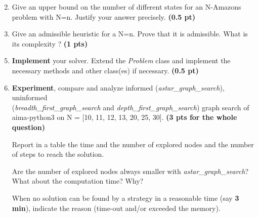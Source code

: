 \documentclass[11pt,a4paper]{report}
\begin{document}
\begin{answers}[8cm]
\end{answers}


\newpage
\begin{enumerate}
\setcounter{enumi}{1}
\item Give an upper bound on the number of different states for an N-Amazons problem with N=n. Justify your answer precisely. \textbf{(0.5 pt)}
\end{enumerate}

\begin{answers}[5cm]
\end{answers}



\begin{enumerate}
\setcounter{enumi}{2}
\item Give an admissible heuristic for a N=n. Prove that it is admissible. What is its complexity ? \textbf{(1 pts)}
\end{enumerate}

\begin{answers}[5cm]
\end{answers}



\begin{enumerate}
\setcounter{enumi}{4}
\item \textbf{Implement} your solver. Extend the \emph{Problem} class and implement 
		the necessary methods and other class(es) if necessary.  \textbf{(0.5 pt)}
\item \textbf{Experiment}, compare and analyze informed (\emph{astar\_graph\_search}), uninformed \\
    (\emph{breadth\_first\_graph\_search} and \emph{depth\_first\_graph\_search}) graph search of aima-python3 on N = [10, 11, 12, 13, 20, 25, 30]. \textbf{(3 pts for the whole question)}
		
		Report in a table the time and the number of explored nodes and the number of 
		steps to reach the solution.
		
		Are the number of explored nodes always smaller with 
		\emph{astar\_graph\_search}? 
		What about the computation time? 
		Why? 
		 
		 When no solution can be found by a strategy in a reasonable time (say \textbf{3 
		 min}), indicate the reason (time-out and/or exceeded the memory).
\end{enumerate}

\begin{answers}[8cm]

\end{answers}
\end{document}
